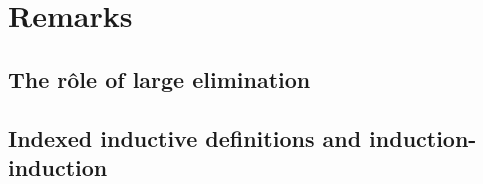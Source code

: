 \documentclass{article}
\begin{document}
 \section{Remarks} %
 \label{sec:remarks}

 \subsection{The r\^{o}le of large elimination}
 \label{sec:large-elim}



\subsection{Indexed inductive definitions and induction-induction}
\label{sec:indexed-induction}






\end{document}

